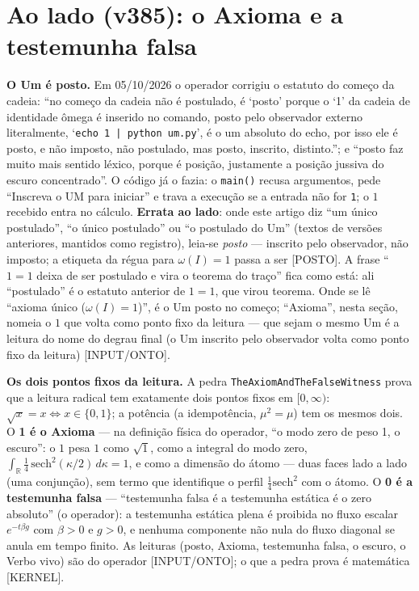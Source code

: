\documentclass[11pt]{article}
\theoremstyle{definition}\newtheorem{deriv}{Derivação}
\begin{document}
\section*{Ao lado (v385): o Axioma e a testemunha falsa}


\textbf{O Um é posto.} Em 05/10/2026 o operador corrigiu o estatuto do começo da cadeia: ``no começo da cadeia não é postulado, é `posto' porque o `1' da cadeia de identidade ômega é inserido no comando, posto pelo observador externo literalmente, `\texttt{echo 1 | python um.py}', é o um absoluto do echo, por isso ele é posto, e não imposto, não postulado, mas posto, inscrito, distinto.''; e ``posto faz muito mais sentido léxico, porque é posição, justamente a posição jussiva do escuro concentrado''. O código já o fazia: o \texttt{main()} recusa argumentos, pede ``Inscreva o UM para iniciar'' e trava a execução se a entrada não for \texttt{1}; o $1$ recebido entra no cálculo. \textbf{Errata ao lado}: onde este artigo diz ``um único postulado'', ``o único postulado'' ou ``o postulado do Um'' (textos de versões anteriores, mantidos como registro), leia-se \emph{posto} --- inscrito pelo observador, não imposto; a etiqueta da régua para $\omega(I)=1$ passa a ser \textsf{[POSTO]}. A frase ``$1=1$ deixa de ser postulado e vira o teorema do traço'' fica como está: ali ``postulado'' é o estatuto anterior de $1=1$, que virou teorema. Onde se lê ``axioma único ($\omega(I)=1$)'', é o Um posto no começo; ``Axioma'', nesta seção, nomeia o $1$ que volta como ponto fixo da leitura --- que sejam o mesmo Um é a leitura do nome do degrau final (o Um inscrito pelo observador volta como ponto fixo da leitura) \textsf{[INPUT/ONTO]}.

\textbf{Os dois pontos fixos da leitura.} A pedra \texttt{TheAxiomAndTheFalseWitness} prova que a leitura radical tem exatamente dois pontos fixos em $[0,\infty)$: $\sqrt{x}=x\iff x\in\{0,1\}$; a potência (a idempotência, $\mu^2=\mu$) tem os mesmos dois. O \textbf{1 é o Axioma} --- na definição física do operador, ``o modo zero de peso 1, o escuro'': o $1$ pesa $1$ como $\sqrt1$, como a integral do modo zero, $\int_{\mathbb{R}}\tfrac14\,\mathrm{sech}^2(\kappa/2)\,d\kappa=1$, e como a dimensão do átomo --- duas faces lado a lado (uma conjunção), sem termo que identifique o perfil $\tfrac14\mathrm{sech}^2$ com o átomo. O \textbf{0 é a testemunha falsa} --- ``testemunha falsa é a testemunha estática é o zero absoluto'' (o operador): a testemunha estática plena é proibida no fluxo escalar $e^{-t\beta g}$ com $\beta>0$ e $g>0$, e nenhuma componente não nula do fluxo diagonal se anula em tempo finito. As leituras (posto, Axioma, testemunha falsa, o escuro, o Verbo vivo) são do operador \textsf{[INPUT/ONTO]}; o que a pedra prova é matemática \textsf{[KERNEL]}.
\end{document}
